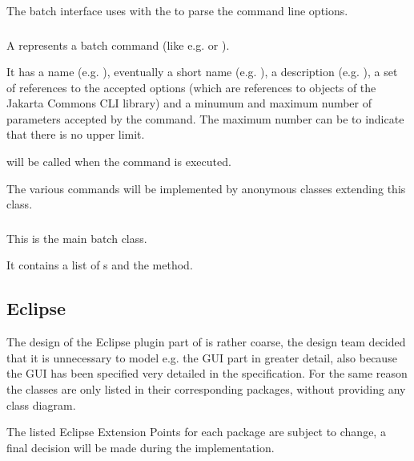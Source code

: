 The batch interface uses
with the
to parse the command line options.

\subsubsection{}

A  represents a \gbt batch command (like e.g. 
or ).

It has a name (e.g. ), eventually a short name (e.g.
), a description (e.g. ), a
set of references to the accepted options (which are references to 
objects of the Jakarta Commons CLI library) and a minumum and maximum number of
parameters accepted by the command. The maximum number can be 
to indicate that there is no upper limit.

 will be called when the command is executed.

The various commands will be implemented by anonymous classes extending this
class.

\subsubsection{}

This is the main batch class.

It contains a list of s and the  method.

\subsection{Eclipse} \label{Eclipse}
The design of the Eclipse plugin part of \gbt is rather coarse, the design team decided that it is unnecessary to model e.g. the GUI part in greater detail, also because the GUI has been specified very detailed in the specification. For the same reason the classes are only listed in their corresponding packages, without providing any class diagram.

\def\extpoint#1{
\item \code{org.eclipse.#1}
}

\par The listed Eclipse Extension Points for each package are subject to change, a final decision will be made during the implementation.

